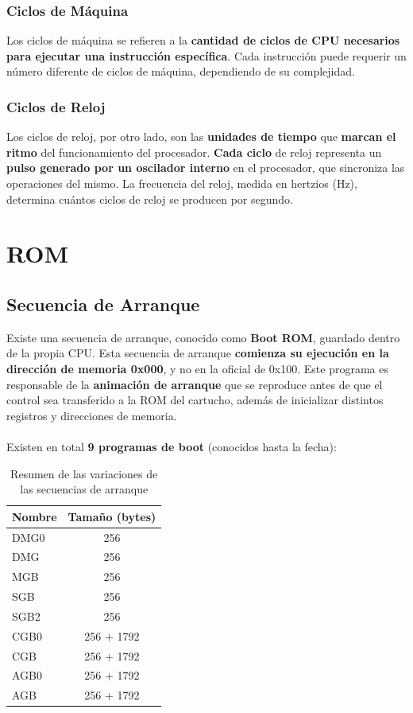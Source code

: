 \subsubsection{Ciclos de Máquina}
Los ciclos de máquina se refieren a la \textbf{cantidad de ciclos de CPU necesarios para ejecutar una instrucción específica}. Cada instrucción puede requerir un número diferente de ciclos de máquina, dependiendo de su complejidad.

\subsubsection{Ciclos de Reloj}
Los ciclos de reloj, por otro lado, son las \textbf{unidades de tiempo} que \textbf{marcan el ritmo} del funcionamiento del procesador. \textbf{Cada ciclo} de reloj representa un \textbf{pulso generado por un oscilador interno} en el procesador, que sincroniza las operaciones del mismo. La frecuencia del reloj, medida en hertzios (Hz), determina cuántos ciclos de reloj se producen por segundo.

\section{ROM}
\subsection{Secuencia de Arranque}

Existe una secuencia de arranque, conocido como \textbf{Boot ROM}, guardado dentro de la propia CPU. Esta secuencia de arranque \textbf{comienza su ejecución en la dirección de memoria 0x000}, y no en la oficial de 0x100. Este programa es responsable de la \textbf{animación de arranque} que se reproduce antes de que el control sea transferido a la ROM del cartucho, además de inicializar distintos registros y direcciones de memoria.
\\\\
Existen en total \textbf{9 programas de boot} (conocidos hasta la fecha):
\begin{table}[h!]
\centering
\begin{tabular}{|l|c|}
\hline
\textbf{Nombre} & \textbf{Tamaño (bytes)} \\ \hline
DMG0 & 256 \\ \hline
DMG  & 256 \\ \hline
MGB  & 256 \\ \hline
SGB  & 256 \\ \hline
SGB2 & 256 \\ \hline
CGB0 & 256 + 1792 \\ \hline
CGB  & 256 + 1792 \\ \hline
AGB0 & 256 + 1792 \\ \hline
AGB  & 256 + 1792 \\ \hline
\end{tabular}
\caption{Resumen de las variaciones de las secuencias de arranque}
\end{table}

